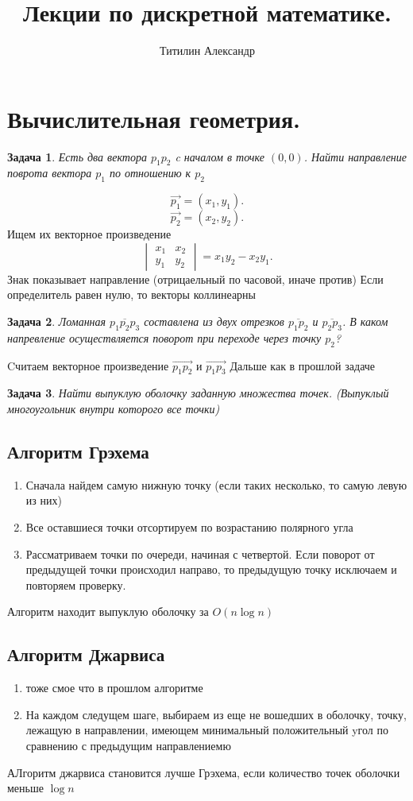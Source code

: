 \documentclass{scrartcl}
\title{Лекции по дискретной математике.}
\author{Титилин Александр}
\date{}
\newtheorem{task}{Задача}
\begin{document}
\maketitle
\section{Вычислительная геометрия.}
\begin{task}
    Есть два вектора $p_1 p_2$ c началом в точке $(0,0)$. Найти направление поврота вектора  $p_1$ по отношению к $p_2$ 
\end{task}
\[
\vec{p_1} = (x_1,y_1)
.\] 
\[
\vec{p_2} = (x_2,y_2)
.\] 
Ищем их векторное произведение
\[
    \begin{vmatrix}
        x_1 & x_2\\
        y_1 & y_2
    \end{vmatrix}  = x_1y_2 - x_2y_1
.\] 
Знак показывает направление (отрицаельный по часовой, иначе против)
Если определитель равен нулю, то векторы коллинеарны
\begin{task}
    Ломанная $\overline{p_1p_2p_3}$ составлена из двух отрезков $\overline{p_1p_2}$ и $\overline{p_2p_3}$. В каком напревление осуществляется поворот
    при переходе через точку $p_2$?
\end{task}
Cчитаем векторное произведение $\vec{p_1p_2}$ и $\vec{p_1p_3}$
Дальше как в прошлой задаче
\begin{task}
	Найти выпуклую оболочку заданную множества точек. (Выпуклый многоугольник внутри которого все точки)
\end{task}
\subsection{Алгоритм Грэхема}
\begin{enumerate}
	\item Сначала найдем самую нижную точку (если таких несколько, то самую левую из них)
	\item Все оставшиеся точки отсортируем по возрастанию полярного угла
	\item Рассматриваем точки по очереди, начиная с четвертой. Если поворот от предыдущей точки происходил направо, то предыдущую точку исключаем и повторяем проверку.
\end{enumerate}
Алгоритм находит выпуклую оболочку за $O(n \log{n})$
\subsection{Алгоритм Джарвиса}
\begin{enumerate}
    \item тоже смое что в прошлом алгоритме
    \item На каждом следущем шаге, выбираем из
        еще не вошедших в оболочку, точку, лежащую в направлении, имеющем минимальный положительный yгол по сравнению с предыдущим направлениемю
\end{enumerate}
АЛгоритм джарвиса становится лучше Грэхема, если количество точек оболочки меньше $\log{n}$
\end{document}
